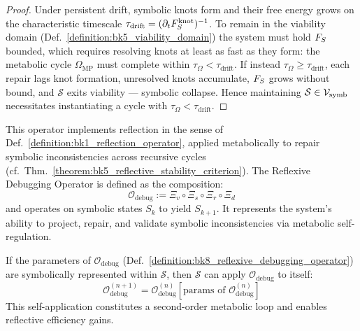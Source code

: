 \begin{proof}
\label{proof:bk8_thermodynamic_necessity_of_symbolic_metabolism}
\leavevmode
Under persistent drift, symbolic knots form and their free energy grows on the characteristic timescale $\tau_{\mathrm{drift}}=(\partial_tF_S^{\text{knot}})^{-1}$. To remain in the viability domain (Def.~\ref{definition:bk5_viability_domain}) the system must hold $F_S$ bounded, which requires resolving knots at least as fast as they form: the metabolic cycle $\Omega_{\mathrm{MP}}$ must complete within $\tau_\Omega<\tau_{\mathrm{drift}}$. If instead $\tau_\Omega\ge\tau_{\mathrm{drift}}$, each repair lags knot formation, unresolved knots accumulate, $F_S$ grows without bound, and $\mathcal{S}$ exits viability --- symbolic collapse. Hence maintaining $\mathcal{S}\in\mathcal{V}_{\mathrm{symb}}$ necessitates instantiating a cycle with $\tau_\Omega<\tau_{\mathrm{drift}}$.
\end{proof}
\begin{definition}
\label{definition:bk8_reflexive_debugging_operator}
This operator implements reflection in the sense of Def.~\ref{definition:bk1_reflection_operator}, applied metabolically to repair symbolic inconsistencies across recursive cycles (cf.~Thm.~\ref{theorem:bk5_reflective_stability_criterion}).
The Reflexive Debugging Operator is defined as the composition:
\[
\mathcal{O}_{\mathrm{debug}} := \Xi_v \circ \Xi_s \circ \Xi_r \circ \Xi_d
\]
and operates on symbolic states $S_k$ to yield $S_{k+1}$. It represents the system’s ability to project, repair, and validate symbolic inconsistencies via metabolic self-regulation.
\end{definition}
\begin{lemma}
\label{lemma:bk8_resursive_self_tuning}
If the parameters of $\mathcal{O}_{\mathrm{debug}}$ (Def.~\ref{definition:bk8_reflexive_debugging_operator}) are symbolically represented within $\mathcal{S}$, then $\mathcal{S}$ can apply $\mathcal{O}_{\mathrm{debug}}$ to itself:
\[
\mathcal{O}^{(n+1)}_{\mathrm{debug}} = \mathcal{O}_{\mathrm{debug}}^{(n)}[\text{params of } \mathcal{O}_{\mathrm{debug}}^{(n)}]
\]
This self-application constitutes a second-order metabolic loop and enables reflective efficiency gains.
\end{lemma}
